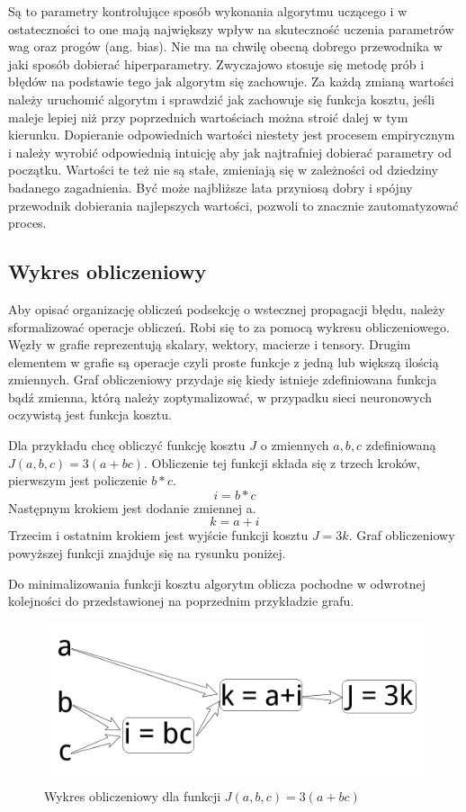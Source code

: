 \documentclass[12pt,a4paper,twoside,titlepage,openright]{book}
\begin{document}
Są to parametry kontrolujące sposób wykonania algorytmu uczącego i w ostateczności to one mają największy wpływ na skuteczność uczenia parametrów wag oraz progów (ang. bias). Nie ma na chwilę obecną dobrego przewodnika w jaki sposób dobierać hiperparametry. Zwyczajowo stosuje się metodę prób i błędów na podstawie tego jak algorytm się zachowuje.\cite{sitefastAI} Za każdą zmianą wartości należy uruchomić algorytm i sprawdzić jak zachowuje się funkcja kosztu, jeśli maleje lepiej niż przy poprzednich wartościach można stroić dalej w tym kierunku. Dopieranie odpowiednich wartości niestety jest procesem empirycznym i należy wyrobić odpowiednią intuicję aby jak najtrafniej dobierać parametry od początku. Wartości te też nie są stałe, zmieniają się w zależności od dziedziny badanego zagadnienia. Być może najbliższe lata przyniosą dobry i spójny przewodnik dobierania najlepszych wartości, pozwoli to znacznie zautomatyzować proces.

\subsection{Wykres obliczeniowy}
Aby opisać organizację obliczeń podsekcję o wstecznej propagacji błędu, należy sformalizować operacje obliczeń. Robi się to za pomocą wykresu obliczeniowego. Węzły w grafie reprezentują skalary, wektory, macierze i tensory. Drugim elementem w grafie są operacje czyli proste funkcje z jedną lub większą ilością zmiennych. Graf obliczeniowy przydaje się kiedy istnieje zdefiniowana funkcja bądź zmienna, którą należy zoptymalizować, w przypadku sieci neuronowych oczywistą jest funkcja kosztu.

Dla przykładu chcę obliczyć funkcję kosztu \(J\) o zmiennych \(a,b,c\) zdefiniowaną \(J(a,b,c) = 3(a+bc)\). Obliczenie tej funkcji składa się z trzech kroków, pierwszym jest policzenie \(b*c\).
$$i = b * c$$
Następnym krokiem jest dodanie zmiennej a.
$$k = a + i$$
Trzecim i ostatnim krokiem jest wyjście funkcji kosztu \(J = 3k\).
Graf obliczeniowy powyższej funkcji znajduje się na rysunku poniżej.

Do minimalizowania funkcji kosztu algorytm oblicza pochodne w odwrotnej kolejności do przedstawionej na poprzednim przykładzie grafu.

\begin{figure}[ht]
	\centering
			\includegraphics[resolution=100, scale=0.5]{ComputationGraph.png}
		\caption{Wykres obliczeniowy dla funkcji \(J(a,b,c) = 3(a+bc)\)}
\end{figure}
\end{document}
